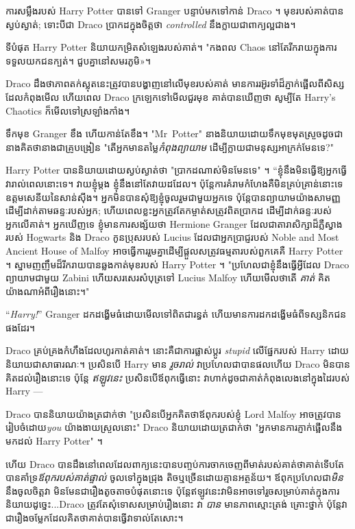 ការសម្លឹងរបស់ Harry Potter បានទៅ Granger បន្ទាប់មកទៅកាន់ Draco ។ មុខរបស់គាត់បានស្ងប់ស្ងាត់; ទោះបីជា Draco ប្រាកដក្នុងចិត្តថា \emph{controlled} នឹងក្លាយជាពាក្យល្អជាង។

ទីបំផុត Harry Potter និយាយកម្រិតសំឡេងរបស់គាត់។ "កងពល Chaos នៅតែរីករាយក្នុងការទទួលយកជនក្បត់។ ជួបគ្នានៅសមរភូមិ»។

Draco ដឹងថាភាពតក់ស្លុតនេះត្រូវបានបង្ហាញនៅលើមុខរបស់គាត់ មាន​ការ​រអ៊ូរទាំ​ដ៏​ភ្ញាក់ផ្អើល​ពី​សិស្ស​ដែល​កំពុង​មើល ហើយ​ពេល Draco ក្រឡេក​ទៅ​មើល​ជួរ​មុខ គាត់​បាន​ឃើញ​ថា សូម្បី​តែ Harry's Chaotics ក៏​មើល​ទៅ​ស្រឡាំងកាំង។

ទឹកមុខ Granger ខឹង ហើយកាន់តែខឹង។ "Mr~Potter" នាងនិយាយដោយទឹកមុខមុតស្រួចដូចជានាងគិតថានាងជាគ្រូបង្រៀន "តើអ្នកមានតម្លៃ\emph{កំពុងព្យាយាម} ដើម្បីក្លាយជាមនុស្សអាក្រក់មែនទេ?"

Harry Potter បាននិយាយដោយស្ងប់ស្ងាត់ថា "ប្រាកដណាស់មិនមែនទេ" ។ “ខ្ញុំនឹងមិនធ្វើឱ្យអ្នកធ្វើវារាល់ពេលនោះទេ។ វាយ​ខ្ញុំ​ម្តង ខ្ញុំ​នឹង​នៅ​តែ​វាយ​ដដែល។ ប៉ុន្តែ​ការ​គំរាម​កំហែង​គឺ​មិន​គ្រប់​គ្រាន់​នោះ​ទេ​ ឧត្តមសេនីយ​នៃ​សាន់​ស៊ីង។ អ្នក​មិន​បាន​សុំ​ឱ្យ​ខ្ញុំ​ចូល​រួម​ជាមួយ​អ្នក​ទេ ប៉ុន្តែ​បាន​ព្យាយាម​យ៉ាង​សាមញ្ញ​ដើម្បី​ដាក់​តាម​ឆន្ទៈ​របស់​អ្នក; ហើយពេលខ្លះអ្នកត្រូវតែកម្ចាត់សត្រូវពិតប្រាកដ ដើម្បីដាក់ឆន្ទៈរបស់អ្នកលើគាត់។ អ្នកឃើញទេ ខ្ញុំមានការសង្ស័យថា Hermione Granger ដែលជាតារាសិក្សាដ៏ភ្លឺស្វាងរបស់ Hogwarts និង Draco កូនប្រុសរបស់ Lucius ដែលជាអ្នកប្រាជ្ញរបស់ Noble and Most Ancient House of Malfoy អាចធ្វើការរួមគ្នាដើម្បីផ្តួលសត្រូវធម្មតារបស់ពួកគេគឺ Harry Potter ។ ស្នាមញញឹមដ៏រីករាយបានឆ្លងកាត់មុខរបស់ Harry Potter ។ "ប្រហែលជាខ្ញុំនឹងធ្វើអ្វីដែល Draco ព្យាយាមជាមួយ Zabini ហើយសរសេរសំបុត្រទៅ Lucius Malfoy ហើយមើលថាតើ \emph{គាត់} គិតយ៉ាងណាអំពីរឿងនោះ។"

“\emph{Harry!}” Granger ដកដង្ហើមធំដោយមើលទៅពិតជារន្ធត់ ហើយមានការដកដង្ហើមធំពីទស្សនិកជនផងដែរ។

Draco គ្រប់គ្រងកំហឹងដែលហូរកាត់គាត់។ នោះគឺជាការផ្លាស់ប្តូរ \emph{ stupid} លើផ្នែករបស់ Harry ដោយនិយាយជាសាធារណៈ។ ប្រសិនបើ Harry មាន \emph{រួចរាល់} វាប្រហែលជាបានផលហើយ Draco មិនបានគិតដល់រឿងនោះទេ ប៉ុន្តែ \emph{ឥឡូវនេះ} ប្រសិនបើឪពុកធ្វើនោះ វាហាក់ដូចជាគាត់កំពុងលេងនៅក្នុងដៃរបស់ Harry —

Draco បាននិយាយយ៉ាងត្រជាក់ថា "ប្រសិនបើអ្នកគិតថាឪពុករបស់ខ្ញុំ Lord Malfoy អាចត្រូវបានរៀបចំដោយ\emph{you} យ៉ាងងាយស្រួលនោះ" Draco និយាយដោយត្រជាក់ថា "អ្នកមានការភ្ញាក់ផ្អើលនឹងមកដល់ Harry Potter" ។

ហើយ Draco បានដឹងនៅពេលដែលពាក្យនេះបានបញ្ចប់ការចាកចេញពីមាត់របស់គាត់ថាគាត់ទើបតែបានគាំទ្រ\emph{ឪពុករបស់គាត់ផ្ទាល់} ចូលទៅក្នុងជ្រុង តិចឬច្រើនដោយគ្មានអត្ថន័យ។ ឪពុកប្រហែលជា\emph{មិន}នឹងចូលចិត្តវា មិនមែនជារឿងតូចតាចបំផុតនោះទេ ប៉ុន្តែឥឡូវនេះវាមិនអាចទៅរួចសម្រាប់គាត់ក្នុងការនិយាយដូច្នេះ...Draco ត្រូវតែសុំទោសសម្រាប់រឿងនោះ វា \emph{បាន} មានភាពស្មោះត្រង់ គ្រោះថ្នាក់ ប៉ុន្តែវាជារឿងចម្លែកដែលគិតថាគាត់បានធ្វើវាទាល់តែសោះ។

